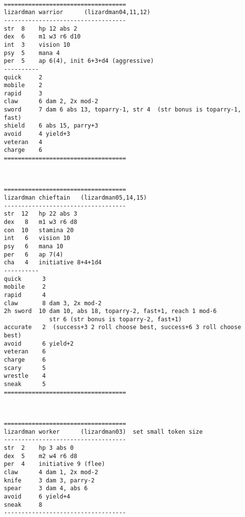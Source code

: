 \

\goodbreak \begin{samepage} \small \begin{verbatim}
===================================
lizardman warrior      (lizardman04,11,12)
-----------------------------------
str  8    hp 12 abs 2
dex  6    m1 w3 r6 d10
int  3    vision 10
psy  5    mana 4
per  5    ap 6(4), init 6+3+d4 (aggressive)
----------
quick     2
mobile    2
rapid     3
claw      6 dam 2, 2x mod-2
sword     7 dam 6 abs 13, toparry-1, str 4  (str bonus is toparry-1, fast)
shield    6 abs 15, parry+3
avoid     4 yield+3
veteran   4
charge    6
===================================
\end{verbatim} \normalsize \end{samepage}

\

\goodbreak \begin{samepage} \small \begin{verbatim}
===================================
lizardman chieftain   (lizardman05,14,15)
-----------------------------------
str  12   hp 22 abs 3
dex   8   m1 w3 r6 d8
con  10   stamina 20
int   6   vision 10
psy   6   mana 10
per   6   ap 7(4)
cha   4   initiative 8+4+1d4
----------
quick      3
mobile     2
rapid      4
claw       8 dam 3, 2x mod-2
2h sword  10 dam 10, abs 18, toparry-2, fast+1, reach 1 mod-6
             str 6 (str bonus is toparry-2, fast+1)
accurate   2  (success+3 2 roll choose best, success+6 3 roll choose best)
avoid      6 yield+2
veteran    6
charge     6
scary      5
wrestle    4
sneak      5
===================================
\end{verbatim} \normalsize \end{samepage}

\

\goodbreak \begin{samepage} \small \begin{verbatim}
===================================
lizardman worker      (lizardman03)  set small token size
-----------------------------------
str  2    hp 3 abs 0
dex  5    m2 w4 r6 d8
per  4    initiative 9 (flee)
claw      4 dam 1, 2x mod-2
knife     3 dam 3, parry-2
spear     3 dam 4, abs 6
avoid     6 yield+4
sneak     8
-----------------------------------
\end{verbatim} \normalsize \end{samepage}






